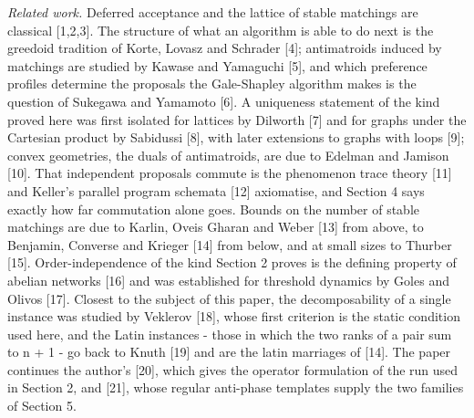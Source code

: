 \documentclass[
  11pt,
]{article}
\begin{document}
\emph{Related work.} Deferred acceptance and the lattice of stable
matchings are classical {[}1,2,3{]}. The structure of what an algorithm
is able to do next is the greedoid tradition of Korte, Lovasz and
Schrader {[}4{]}; antimatroids induced by matchings are studied by
Kawase and Yamaguchi {[}5{]}, and which preference profiles determine
the proposals the Gale-Shapley algorithm makes is the question of
Sukegawa and Yamamoto {[}6{]}. A uniqueness statement of the kind proved
here was first isolated for lattices by Dilworth {[}7{]} and for graphs
under the Cartesian product by Sabidussi {[}8{]}, with later extensions
to graphs with loops {[}9{]}; convex geometries, the duals of
antimatroids, are due to Edelman and Jamison {[}10{]}. That independent
proposals commute is the phenomenon trace theory {[}11{]} and Keller's
parallel program schemata {[}12{]} axiomatise, and Section 4 says
exactly how far commutation alone goes. Bounds on the number of stable
matchings are due to Karlin, Oveis Gharan and Weber {[}13{]} from above,
to Benjamin, Converse and Krieger {[}14{]} from below, and at small
sizes to Thurber {[}15{]}. Order-independence of the kind Section 2
proves is the defining property of abelian networks {[}16{]} and was
established for threshold dynamics by Goles and Olivos {[}17{]}. Closest
to the subject of this paper, the decomposability of a single instance
was studied by Veklerov {[}18{]}, whose first criterion is the static
condition used here, and the Latin instances - those in which the two
ranks of a pair sum to n + 1 - go back to Knuth {[}19{]} and are the
latin marriages of {[}14{]}. The paper continues the author's {[}20{]},
which gives the operator formulation of the run used in Section 2, and
{[}21{]}, whose regular anti-phase templates supply the two families of
Section 5.
\end{document}

